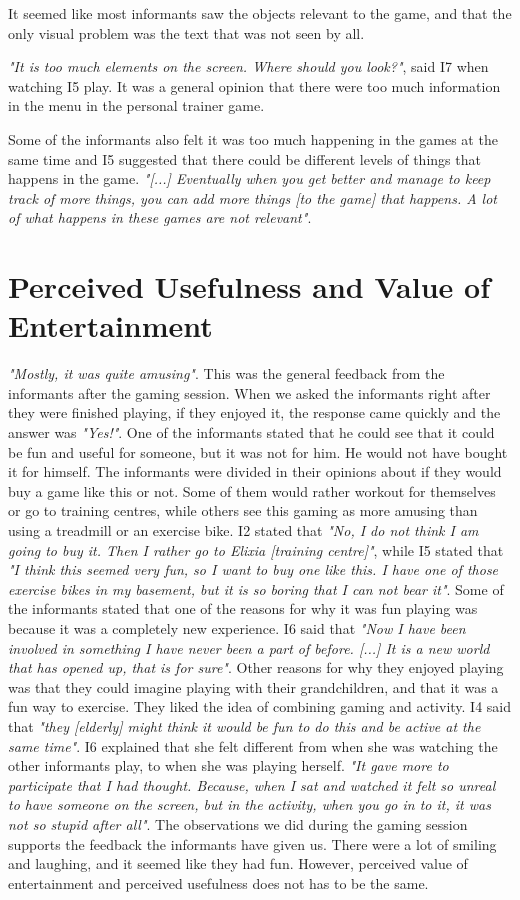 It seemed like most informants saw the objects relevant to the game, and that the only visual problem was the text that was not seen by all.

\emph{"It is too much elements on the screen. Where should you look?"}, said I7 when watching I5 play. It was a general opinion that there were too much information in the menu in the personal trainer game. 

Some of the informants also felt it was too much happening in the games at the same time and I5 suggested that there could be different levels of things that happens in the game. \emph{"[...] Eventually when you get better and manage to keep track of more things, you can add more things [to the game] that happens. A lot of what happens in these games are not relevant"}.

\section{Perceived Usefulness and Value of Entertainment}
\emph{"Mostly, it was quite amusing"}. This was the general feedback from the informants after the gaming session. When we asked the informants right after they were finished playing, if they enjoyed it, the response came quickly and the answer was \emph{"Yes!"}. One of the informants stated that he could see that it could be fun and useful for someone, but it was not for him. He would not have bought it for himself. The informants were divided in their opinions about if they would buy a game like this or not. Some of them would rather workout for themselves or go to training centres, while others see this gaming as more amusing than using a treadmill or an exercise bike. I2 stated that \emph{"No, I do not think I am going to buy it. Then I rather go to Elixia [training centre]"}, while I5 stated that \emph{"I think this seemed very fun, so I want to buy one like this. I have one of those exercise bikes in my basement, but it is so boring that I can not bear it"}.  Some of the informants stated that one of the reasons for why it was fun playing was because it was a completely new experience. I6 said that \emph{"Now I have been involved in something I have never been a part of before. [...] It is a new world that has opened up, that is for sure"}. Other reasons for why they enjoyed playing was that they could imagine playing with their grandchildren, and that it was a fun way to exercise. They liked the idea of combining gaming and activity. I4 said that \emph{"they [elderly] might think it would be fun to do this and be active at the same time"}. I6 explained that she felt different from when she was watching the other informants play, to when she was playing herself. \emph{"It gave more to participate that I had thought. Because, when I sat and watched it felt so unreal to have someone on the screen, but in the activity, when you go in to it, it was not so stupid after all"}. The observations we did during the gaming session supports the feedback the informants have given us. There were a lot of smiling and laughing, and it seemed like they had fun. However, perceived value of entertainment and perceived usefulness does not has to be the same. 

